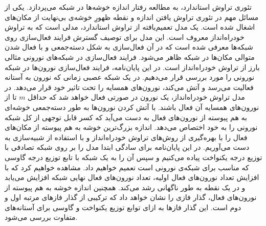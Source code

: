 تئوری تراوش استاندارد،  به مطالعه رفتار  اندازه خوشه‌ها در  شبکه  می‌پردازد. یکی از مسائل مهم در تئوری تراوش یافتن اندازه و نقطه ظهورِ خوشه‌ی بی‌نهایت از مکان‌های اشغال شده است. یک مدل تعمیم‌یافته از تراوش استاندارد، مدلی است که به تراوش خودراه‌انداز معروف است. این مدل برای توصیف گسترش  فرایند فعال‌سازی روی شبکه‌ها معرفی شده است که در آن فعال‌سازی به شکل دسته‌جمعی و با فعال شدن متوالی مکان‌ها در شبکه ظاهر می‌شود.  فرایند فعال‌سازی در شبکه‌های نورونی مثالی بارز از تراوش خودراه‌انداز است. در این پایان‌نامه، فرایند فعال‌سازی نورون‌ها در شبکه نورونی را مورد بررسی قرار می‌دهیم. در یک شبکه عصبی زمانی که نورون به آستانه فعالیت می‌رسد و آتش می‌کند،‌ نورون‌های همسایه را تحت تاثیر خود قرار می‌دهد.  در مدل تراوش خودراه‌انداز، یک نورون در صورتی فعال خواهد شد که حداقل $m$ تا از نورون‌های همسایه آن فعال باشند. با آتش کردن نورون‌ها به طور دسته‌جمعی خوشه‌ای به هم پیوسته از نورون‌های فعال به دست می‌آید که کسر قابل توجهی از کل شبکه نورونی را به خود اختصاص می‌دهد. اندازه بزرگ‌ترین خوشه به هم پیوسته از مکان‌های فعال را با بهره‌گیری از روش‌های تراوش خودراه‌انداز و با استفاده از شبیه‌سازی به دست می‌آوریم. در این پایان‌نامه برای سادگی ابتدا مدل را بر روی شبکه تصادفی با توزیع درجه یکنواخت پیاده می‌کنیم و سپس آن را به یک شبکه با تابع توزیع درجه گاوسی که مناسب برای شبکه‌ی نورونی است تعمیم خواهیم داد. مشاهده خواهیم کرد که با افزایش تعداد نورون‌های فعال اولیه، تعداد نورون‌های فعال نهایی شبکه افزایش می‌یابد و در یک نقطه به طور ناگهانی رشد می‌کند. همچنین اندازه خوشه به هم پیوسته از نورون‌های فعال، گذار فازی را نشان خواهد داد که ترکیبی از گذار فازهای مرتبه اول و دوم است. این گذار فازها به ازای توابع توزیع یکنواخت و گاوسی برای آستانه‌های متفاوت بررسی می‌شود.

